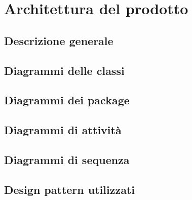 \section{Architettura del prodotto}
\subsection{Descrizione generale}
\subsection{Diagrammi delle classi}
\subsection{Diagrammi dei package}
\subsection{Diagrammi di attività}
\subsection{Diagrammi di sequenza}
\subsection{Design pattern utilizzati}
